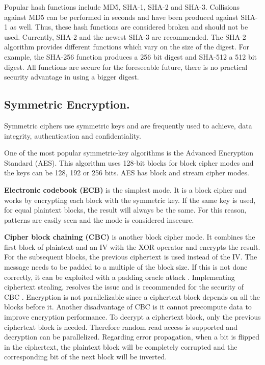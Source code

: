 Popular hash functions include MD5, SHA-1, SHA-2 and SHA-3. Collisions against MD5 can be performed in seconds and have been produced against SHA-1 as well. Thus, these hash functions are considered broken and should not be used. Currently, SHA-2 and the newest SHA-3 are recommended. The SHA-2 algorithm provides different functions which vary on the size of the digest. For example, the SHA-256 function produces a 256 bit digest and SHA-512 a 512 bit digest. All functions are secure for the foreseeable future, there is no practical security advantage in using a bigger digest.

\subsection{Symmetric Encryption.}  \label{chap:background:crypto:symmetric}

Symmetric ciphers use symmetric keys and are frequently used to achieve, data integrity, authentication and confidentiality.

One of the most popular symmetric-key algorithms is the Advanced Encryption Standard (AES). This algorithm uses 128-bit blocks for block cipher modes and the keys can be 128, 192 or 256 bits. AES has block and stream cipher modes.

\textbf{Electronic codebook (ECB)} is the simplest mode. It is a block cipher and works by encrypting each block with the symmetric key. If the same key is used, for equal plaintext blocks, the result will always be the same. For this reason, patterns are easily seen and the mode is considered insecure.

\textbf{Cipher block chaining (CBC)} is another block cipher mode. It combines the first block of plaintext and an IV with the XOR operator and encrypts the result. For the subsequent blocks, the previous ciphertext is used instead of the IV. The message needs to be padded to a multiple of the block size. If this is not done correctly, it can be exploited with a padding oracle attack \cite{paddingoracle}. Implementing ciphertext stealing, resolves the issue and is recommended for the security of CBC \cite{ciphertextstealing}.
Encryption is not parallelizable since a ciphertext block depends on all the blocks before it. Another disadvantage of CBC is it cannot precompute data to improve encryption performance.
To decrypt a ciphertext block, only the previous ciphertext block is needed. Therefore random read access is supported and decryption can be parallelized.
Regarding error propagation, when a bit is flipped in the ciphertext, the plaintext block will be completely corrupted and the corresponding bit of the next block will be inverted.

